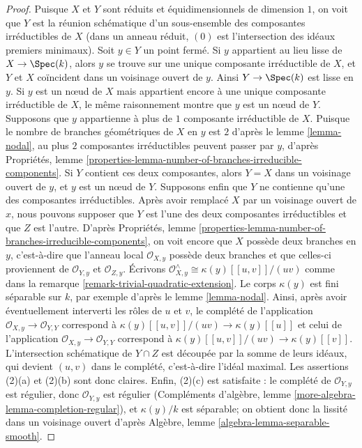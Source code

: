 \begin{proof}
Puisque $X$ et $Y$ sont réduits et équidimensionnels de dimension $1$, on voit que $Y$ est la réunion schématique d'un sous-ensemble des composantes irréductibles de $X$ (dans un anneau réduit, $(0)$ est l'intersection des idéaux premiers minimaux). Soit $y \in Y$ un point fermé. Si $y$ appartient au lieu lisse de $X \to \Spec(k)$, alors $y$ se trouve sur une unique composante irréductible de $X$, et $Y$ et $X$ coïncident dans un voisinage ouvert de $y$. Ainsi $Y \to \Spec(k)$ est lisse en $y$. Si $y$ est un nœud de $X$ mais appartient encore à une unique composante irréductible de $X$, le même raisonnement montre que $y$ est un nœud de $Y$. Supposons que $y$ appartienne à plus de $1$ composante irréductible de $X$. Puisque le nombre de branches géométriques de $X$ en $y$ est $2$ d'après le lemme \ref{lemma-nodal}, au plus $2$ composantes irréductibles peuvent passer par $y$, d'après Propriétés, lemme \ref{properties-lemma-number-of-branches-irreducible-components}. Si $Y$ contient ces deux composantes, alors $Y = X$ dans un voisinage ouvert de $y$, et $y$ est un nœud de $Y$. Supposons enfin que $Y$ ne contienne qu'une des composantes irréductibles. Après avoir remplacé $X$ par un voisinage ouvert de $x$, nous pouvons supposer que $Y$ est l'une des deux composantes irréductibles et que $Z$ est l'autre. D'après Propriétés, lemme \ref{properties-lemma-number-of-branches-irreducible-components}, on voit encore que $X$ possède deux branches en $y$, c'est-à-dire que l'anneau local $\mathcal{O}_{X, y}$ possède deux branches et que celles-ci proviennent de $\mathcal{O}_{Y, y}$ et $\mathcal{O}_{Z, y}$. Écrivons $\mathcal{O}_{X, y}^\wedge \cong \kappa(y)[[u, v]]/(uv)$ comme dans la remarque \ref{remark-trivial-quadratic-extension}. Le corps $\kappa(y)$ est fini séparable sur $k$, par exemple d'après le lemme \ref{lemma-nodal}. Ainsi, après avoir éventuellement interverti les rôles de $u$ et $v$, le complété de l'application $\mathcal{O}_{X, y} \to \mathcal{O}_{Y, Y}$ correspond à $\kappa(y)[[u, v]]/(uv) \to \kappa(y)[[u]]$ et celui de l'application $\mathcal{O}_{X, y} \to \mathcal{O}_{Y, Y}$ correspond à $\kappa(y)[[u, v]]/(uv) \to \kappa(y)[[v]]$. L'intersection schématique de $Y \cap Z$ est découpée par la somme de leurs idéaux, qui devient $(u, v)$ dans le complété, c'est-à-dire l'idéal maximal. Les assertions (2)(a) et (2)(b) sont donc claires. Enfin, (2)(c) est satisfaite : le complété de $\mathcal{O}_{Y, y}$ est régulier, donc $\mathcal{O}_{Y, y}$ est régulier (Compléments d'algèbre, lemme \ref{more-algebra-lemma-completion-regular}), et $\kappa(y)/k$ est séparable; on obtient donc la lissité dans un voisinage ouvert d'après Algèbre, lemme \ref{algebra-lemma-separable-smooth}.
\end{proof}





